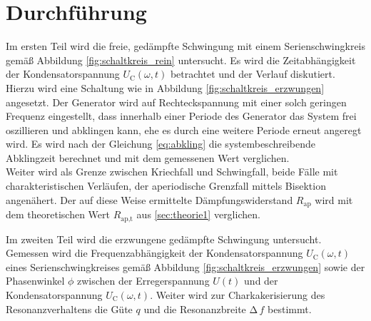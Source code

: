 \section{Durchführung}
\label{sec:Durchfuehrung}

Im ersten Teil wird die freie, gedämpfte Schwingung mit einem Serienschwingkreis gemäß Abbildung \ref{fig:schaltkreis_rein} untersucht.
Es wird die Zeitabhängigkeit der Kondensatorspannung $U_\mathup{C}(\omega, t)$ betrachtet und der Verlauf diskutiert.\\
Hierzu wird eine Schaltung wie in Abbildung \ref{fig:schaltkreis_erzwungen} angesetzt.
Der Generator wird auf Rechteckspannung mit einer solch geringen Frequenz eingestellt, dass innerhalb einer Periode des Generator das System frei oszillieren und abklingen kann, ehe es durch eine weitere Periode erneut angeregt wird.
Es wird nach der Gleichung \eqref{eq:abkling} die systembeschreibende Abklingzeit berechnet und mit dem gemessenen Wert verglichen.\\
Weiter wird als Grenze zwischen Kriechfall und Schwingfall, beide Fälle mit charakteristischen Verläufen,  der aperiodische Grenzfall mittels Bisektion angenähert.
Der auf diese Weise ermittelte Dämpfungswiderstand $R_\text{ap}$ wird mit dem theoretischen Wert $R_\text{ap,t}$ aus \ref{sec:theorie1} verglichen.

Im zweiten Teil wird die erzwungene gedämpfte Schwingung untersucht.
Gemessen wird die Frequenzabhängigkeit der Kondensatorspannung $U_\mathup{C}(\omega, t)$ eines Serienschwingkreises gemäß Abbildung \ref{fig:schaltkreis_erzwungen} sowie der Phasenwinkel $\phi$ zwischen der Erregerspannung $U(t)$ und der Kondensatorspannung $U_\mathup{C}(\omega, t)$.
Weiter wird zur Charkakerisierung des Resonanzverhaltens die Güte $q$ und die Resonanzbreite $\mathup{\Delta}\, f$ bestimmt.




